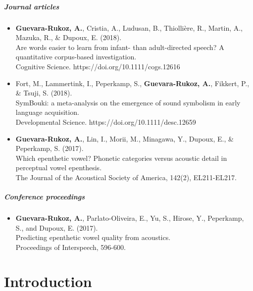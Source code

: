 \documentclass[12pt, twoside]{report}
\begin{document}
\paragraph{Journal articles}
\begin{itemize}
\item \textbf{Guevara-Rukoz, A.}, Cristia, A., Ludusan, B., Thiollière, R., Martin, A., Mazuka, R., \& Dupoux, E. (2018). \\
  Are words easier to learn from infant- than adult-directed speech? A quantitative corpus-based investigation. \\
  Cognitive Science. https://doi.org/10.1111/cogs.12616
\item Fort, M., Lammertink, I., Peperkamp, S., \textbf{Guevara-Rukoz, A.}, Fikkert, P., \& Tsuji, S. (2018). \\
  SymBouki: a meta-analysis on the emergence of sound symbolism in early language acquisition. \\
  Developmental Science. https://doi.org/10.1111/desc.12659
\item \textbf{Guevara-Rukoz, A.}, Lin, I., Morii, M., Minagawa, Y., Dupoux, E., \& Peperkamp, S. (2017). \\
  Which epenthetic vowel? Phonetic categories versus acoustic detail in perceptual vowel epenthesis. \\
  The Journal of the Acoustical Society of America, 142(2), EL211-EL217.
\end{itemize}
\paragraph{Conference proceedings}
\begin{itemize}
\item \textbf{Guevara-Rukoz, A.}, Parlato-Oliveira, E., Yu, S., Hirose, Y., Peperkamp, S., and Dupoux, E. (2017). \\
  Predicting epenthetic vowel quality from acoustics. \\
  Proceedings of Interspeech, 596-600.
\end{itemize}

\dominitoc[n]%
\nomtcrule
\setlength{\mtcindent}{-1.5em}
\setcounter{minitocdepth}{2}

\tableofcontents

\chapter{Introduction}
\setcounter{page}{1}

\end{document}
